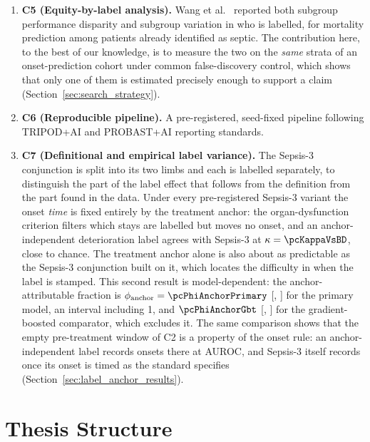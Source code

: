 \begin{enumerate}
    \item \textbf{C5 (Equity-by-label analysis).} Wang et al.\
    \cite{wang2022equity} reported both subgroup performance disparity and
    subgroup variation in who is labelled, for mortality prediction among
    patients already identified as septic. The contribution here, to the best
    of our knowledge, is to measure the two on the \emph{same} strata of an
    onset-prediction cohort under common false-discovery control, which shows
    that only one of them is estimated precisely enough to support a claim
    (Section~\ref{sec:search_strategy}).

    \item \textbf{C6 (Reproducible pipeline).} A pre-registered, seed-fixed
    pipeline following TRIPOD+AI \cite{collins2024tripodai} and PROBAST+AI
    \cite{moons2025probastai} reporting standards.

    \item \textbf{C7 (Definitional and empirical label variance).} The
    Sepsis-3 conjunction is split into its two limbs and each is labelled
    separately, to distinguish the part of the label effect that follows from
    the definition from the part found in the data. Under every pre-registered
    Sepsis-3 variant the onset \emph{time} is fixed entirely by the treatment
    anchor: the organ-dysfunction criterion filters which stays are labelled
    but moves no onset, and an anchor-independent deterioration label agrees
    with Sepsis-3 at $\kappa = \pcKappaVsBD$, close to chance. The treatment
    anchor alone is also about as predictable as the Sepsis-3 conjunction built
    on it, which locates the difficulty in when the label is stamped. This
    second result is model-dependent: the anchor-attributable fraction is
    $\phi_{\text{anchor}} = \pcPhiAnchorPrimary$
    [\pcPhiAnchorCiLoPrimary, \pcPhiAnchorCiHiPrimary] for the primary model,
    an interval including 1, and $\pcPhiAnchorGbt$
    [\pcPhiAnchorCiLoGbt, \pcPhiAnchorCiHiGbt] for the gradient-boosted
    comparator, which excludes it. The same comparison shows that the empty
    pre-treatment window of C2 is a property of the onset rule: an
    anchor-independent label records
    \pcPreTreatOnsetsVarD{} onsets there at \pcPreTreatAurocPrimaryD{} AUROC,
    and Sepsis-3 itself records \pcPreTreatOnsetsVarF{} once its onset is timed
    as the standard specifies (Section~\ref{sec:label_anchor_results}).
\end{enumerate}


\section{Thesis Structure}

